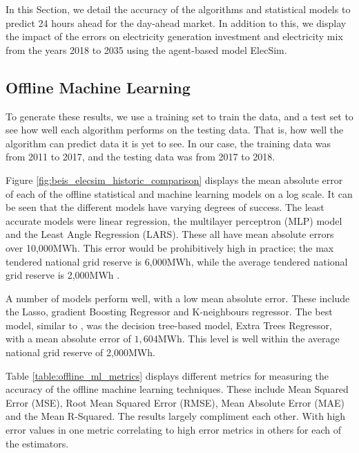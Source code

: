 \documentclass[final,3p,times,twocolumn,numbers]{elsarticle}
\begin{document}
In this Section, we detail the accuracy of the algorithms and statistical models to predict 24 hours ahead for the day-ahead market. In addition to this, we display the impact of the errors on electricity generation investment and electricity mix from the years 2018 to 2035 using the agent-based model ElecSim.



\subsection{Offline Machine Learning}

To generate these results, we use a training set to train the data, and a test set to see how well each algorithm performs on the testing data. That is, how well the algorithm can predict data it is yet to see. In our case, the training data was from 2011 to 2017, and the testing data was from 2017 to 2018.

Figure \ref{fig:beis_elecsim_historic_comparison} displays the mean absolute error of each of the offline statistical and machine learning models on a log scale. It can be seen that the different models have varying degrees of success. The least accurate models were linear regression, the multilayer perceptron (MLP) model and the Least Angle Regression (LARS). These all have mean absolute errors over 10,000MWh. This error would be prohibitively high in practice; the max tendered national grid reserve is 6,000MWh, while the average tendered national grid reserve is 2,000MWh \cite{ESO2019}.



A number of models perform well, with a low mean absolute error. These include the Lasso, gradient Boosting Regressor and K-neighbours regressor. The best model, similar to \cite{Kell2018a}, was the decision tree-based model, Extra Trees Regressor, with a mean absolute error of $1,604$MWh. This level is well within the average national grid reserve of 2,000MWh.

Table \ref{table:offline_ml_metrics} displays different metrics for measuring the accuracy of the offline machine learning techniques. These include Mean Squared Error (MSE), Root Mean Squared Error (RMSE), Mean Absolute Error (MAE) and the Mean R-Squared. The results largely compliment each other. With high error values in one metric correlating to high error metrics in others for each of the estimators.
\end{document}
